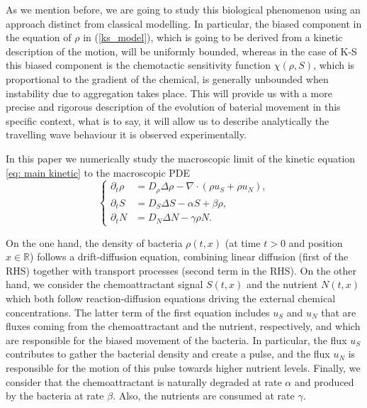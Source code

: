 \documentclass[11pt,twoside]{article}
\theoremstyle{nonumberplain}
\begin{document}
As we mention before, we are going to study this biological phenomenon using an approach distinct from classical modelling. In particular, the biased component in the equation of $\rho$ in (\ref{ks_model}), which is going to be derived from a kinetic description of the motion, will be uniformly bounded, whereas in the case of K-S this biased component is the chemotactic sensitivity function $\chi(\rho, S)$, which is proportional to the gradient of the chemical, is generally unbounded when instability due to aggregation takes place. This will provide us with a more precise and rigorous description of the evolution of baterial movement in this specific context, what is to say, it will allow us to describe analytically the travelling wave behaviour it is observed experimentally.

In this paper we numerically study the macroscopic limit of the kinetic equation \eqref{eq: main kinetic} to the macroscopic PDE
\begin{equation}
  \left \{
    \begin{aligned}
       \partial_t \rho &= D_\rho \Delta \rho - \nabla \cdot (\rho u_S + \rho u_N),\\
       \partial_t S &= D_S \Delta S - \alpha S + \beta \rho,\\
        \partial_t N &= D_N \Delta N - \gamma \rho N.
    \end{aligned}
  \right .
  \label{basicmodel}
\end{equation}

On the one hand, the density of bacteria $\rho(t, x)$ (at time $t>0$ and position $x \in \mathbb{R} $) follows a drift-diffusion equation, combining linear diffusion (first of the RHS) together with transport processes (second term in the RHS). On the other hand, we consider the chemoattractant signal $S(t,x)$ and the nutrient $N(t,x)$ which both follow reaction-diffusion equations driving the external chemical concentrations. The latter term of the first equation includes $u_S$ and $u_N$ that are fluxes coming from the chemoattractant and the nutrient, respectively, and which are responsible for the biased movement of the bacteria. In particular, the flux $u_S$ contributes to gather the bacterial density and create a pulse, and the flux $u_N$ is responsible for the motion of this pulse towards higher nutrient levels.
Finally, we consider that the chemoattractant is naturally degraded at rate $\alpha$ and produced by the bacteria at rate $\beta$. Also, the nutrients are consumed at rate $\gamma$. 
\end{document}
